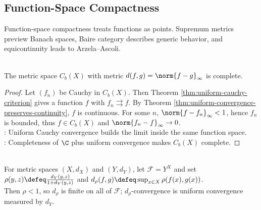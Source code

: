 \subsection{Function-Space Compactness}

%


Function-space compactness treats functions as points. Supremum metrics preview Banach spaces, Baire category describes generic behavior, and equicontinuity leads to Arzela--Ascoli.

\begin{theorem} \label{thm:complete-supremum-metric-space} \\
The metric space $C_b(X)$ with metric $d(f,g)=\norm{f-g}_{\infty}$ is complete.
\begin{proof}
Let $(f_n)$ be Cauchy in $C_b(X)$. Then Theorem \ref{thm:uniform-cauchy-criterion} gives a function $f$ with $f_n\rightrightarrows f$. By Theorem \ref{thm:uniform-convergence-preserves-continuity}, $f$ is continuous. For some $n$, $\norm{f-f_n}_{\infty}<1$, hence $f_n$ is bounded, thus $f\in C_b(X)$ and $\norm{f_n-f}_{\infty}\to0$.\\
: Uniform Cauchy convergence builds the limit inside the same function space.\\
: Completeness of $\C$ plus uniform convergence makes $C_b(X)$ complete.
\end{proof}
\end{theorem}

\begin{definition} \label{def:bounded-target-metric-function-space} \\
For metric spaces $(X,d_X)$ and $(Y,d_Y)$, let $\mathcal{F}=Y^X$ and set $\rho(y,z)\defeq\frac{d_Y(y,z)}{1+d_Y(y,z)}$ and $d_\rho(f,g)\defeq\sup_{x\in X}\rho(f(x),g(x))$.\\
Then $\rho<1$, so $d_\rho$ is finite on all of $\mathcal{F}$; $d_\rho$-convergence is uniform convergence measured by $d_Y$.
\end{definition}

